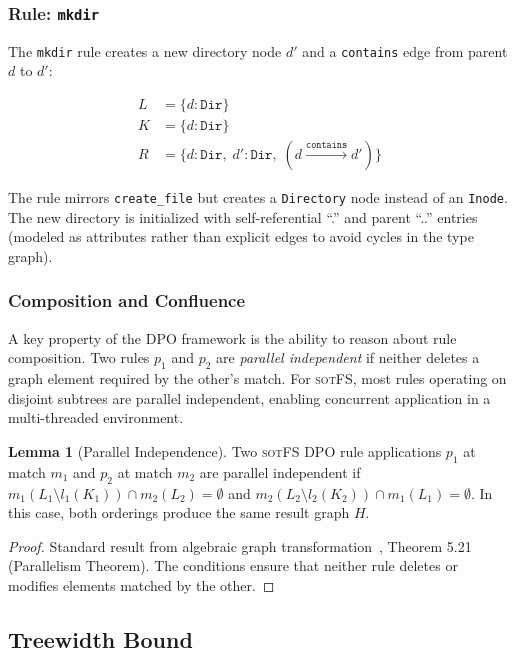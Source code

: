 \documentclass[11pt,a4paper]{article}
\theoremstyle{definition}
\newtheorem{lemma}[theorem]{Lemma}
\theoremstyle{remark}
\newcommand{\sotfs}{\textsc{sotFS}}
\begin{document}
\subsubsection{Rule: \texttt{mkdir}}

The \texttt{mkdir} rule creates a new directory node $d'$ and
a \texttt{contains} edge from parent $d$ to $d'$:

\begin{align*}
L &= \{d : \texttt{Dir}\} \\
K &= \{d : \texttt{Dir}\} \\
R &= \{d : \texttt{Dir},\; d' : \texttt{Dir},\;
       (d \xrightarrow{\texttt{contains}} d')\}
\end{align*}

The rule mirrors \texttt{create\_file} but creates a
\texttt{Directory} node instead of an \texttt{Inode}. The new
directory is initialized with self-referential ``.'' and parent
``..'' entries (modeled as attributes rather than explicit edges
to avoid cycles in the type graph).

\subsubsection{Composition and Confluence}

A key property of the DPO framework is the ability to reason about
rule composition. Two rules $p_1$ and $p_2$ are \emph{parallel
independent} if neither deletes a graph element required by the
other's match. For \sotfs{}, most rules operating on disjoint
subtrees are parallel independent, enabling concurrent application
in a multi-threaded environment.

\begin{lemma}[Parallel Independence]
\label{lem:parallel-indep}
Two \sotfs{} DPO rule applications $p_1$ at match $m_1$ and $p_2$
at match $m_2$ are parallel independent if
$m_1(L_1 \setminus l_1(K_1)) \cap m_2(L_2) = \emptyset$ and
$m_2(L_2 \setminus l_2(K_2)) \cap m_1(L_1) = \emptyset$. In this
case, both orderings produce the same result graph $H$.
\end{lemma}

\begin{proof}
Standard result from algebraic graph
transformation~\cite{ehrig2006}, Theorem 5.21 (Parallelism Theorem).
The conditions ensure that neither rule deletes or modifies elements
matched by the other.
\end{proof}

\subsection{Treewidth Bound}
\label{sec:sotfs-treewidth}
\end{document}
